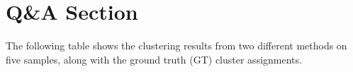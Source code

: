 \documentclass{article}
\begin{document}






\section{Q\&A Section}
The following table shows the clustering results from two different methods on five samples, along with the ground truth (GT) cluster assignments.
\end{document}
